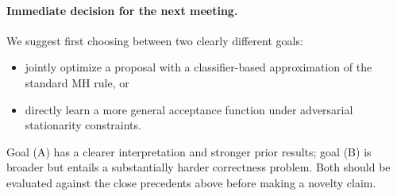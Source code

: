 \documentclass[11pt]{article}
\begin{document}
\paragraph{Immediate decision for the next meeting.}
We suggest first choosing between two clearly different goals: 
\begin{itemize}[itemsep=0pt,topsep=0pt]
\item[(A)] jointly optimize a proposal with a classifier-based approximation of the standard MH rule, or 
\item[(B)] directly learn a more general acceptance function under adversarial stationarity constraints.
\end{itemize} 
Goal (A) has a clearer interpretation and stronger prior results; goal (B) is broader but entails a substantially harder correctness problem. Both should be evaluated against the close precedents above before making a novelty claim.









\newpage
\appendix
\end{document}
